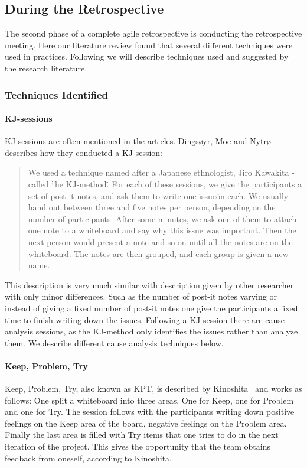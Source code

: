 \documentclass[12pt]{article}
\begin{document}
\subsection{During the Retrospective}
The second phase of a complete agile retrospective is conducting the retrospective meeting. Here our literature review found that several different techniques were used in practices. Following we will describe techniques used and suggested by the research literature.

\subsubsection{Techniques Identified}
\paragraph{KJ-sessions}
KJ-sessions are often mentioned in the articles. Dingsøyr, Moe and Nytrø~\cite{Moe2001} describes how they conducted a KJ-session: 
\begin{quote} We used a technique named after a Japanese ethnologist, Jiro Kawakita - called \"the KJ-method\". For each of these sessions, we give the participants a set of post-it notes, and ask them to write one \"issue\" on each. We usually hand out between three and five notes per person, depending on the number of participants. After some minutes, we ask one of them to attach one note to a whiteboard and say why this issue was important. Then the next person would present a note and so on until all the notes are on the whiteboard. The notes are then grouped, and each group is given a new name. 
\end{quote}
This description is very much similar with description given by other researcher with only minor differences. Such as the number of post-it notes varying or instead of giving a fixed number of post-it notes one give the participants a fixed time to finish writing down the issues. Following a KJ-session there are cause analysis sessions, as the KJ-method only identifies the issues rather than analyze them. We describe different cause analysis techniques below. 

\paragraph{Keep, Problem, Try}
Keep, Problem, Try, also known as KPT, is described by Kinoshita~\cite{Kinoshita2008} and works as follows: One split a whiteboard into three areas. One for Keep, one for Problem and one for Try. The session follows with the participants writing down positive feelings on the Keep area of the board, negative feelings on the Problem area. Finally the last area is filled with Try items that one tries to do in the next iteration of the project. This gives the opportunity that the team obtains feedback from oneself, according to Kinoshita. 
\end{document}
